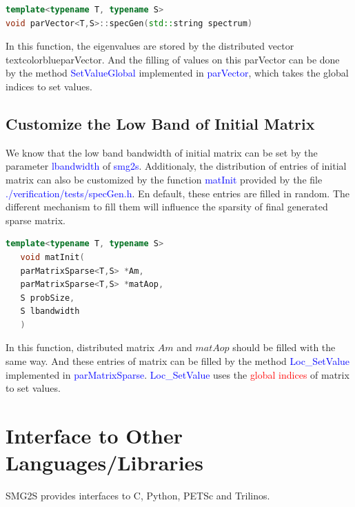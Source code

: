 \documentclass[a4paper, 10 pt]{report}
\begin{document}
	\begin{lstlisting}[language=C++,frame=single]
template<typename T, typename S>
void parVector<T,S>::specGen(std::string spectrum)
\end{lstlisting}

In this function, the eigenvalues are stored by the distributed vector textcolor{blue}{parVector}. And the filling of values on this parVector can be done by  the method \textcolor{blue}{SetValueGlobal} implemented in \textcolor{blue}{parVector}, which takes the global indices to set values.

\section{Customize the Low Band of Initial Matrix}
We know that the low band bandwidth of initial matrix can be set by the parameter  \textcolor{blue}{lbandwidth} of \textcolor{blue}{smg2s}. Additionaly, the distribution of entries of initial matrix can also be customized by the function  \textcolor{blue}{matInit} provided by the file \textcolor{blue}{./verification/tests/specGen.h}. En default, these entries are filled in random. The different mechanism to fill them will influence the sparsity of final generated sparse matrix.

	\begin{lstlisting}[language=C++,frame=single]
   template<typename T, typename S>
   void matInit(
   parMatrixSparse<T,S> *Am, 
   parMatrixSparse<T,S> *matAop, 
   S probSize, 
   S lbandwidth
   )
\end{lstlisting}

In this function, distributed matrix $Am$ and $matAop$ should be filled with the same way. And these entries of matrix can be filled by the method \textcolor{blue}{Loc\_SetValue} implemented in \textcolor{blue}{parMatrixSparse}. \textcolor{blue}{Loc\_SetValue} uses the \textcolor{red}{global indices} of matrix to set values.

\newpage
	
	\chapter{Interface to Other Languages/Libraries}
	SMG2S provides interfaces to C, Python, PETSc and Trilinos.
	
\end{document}
